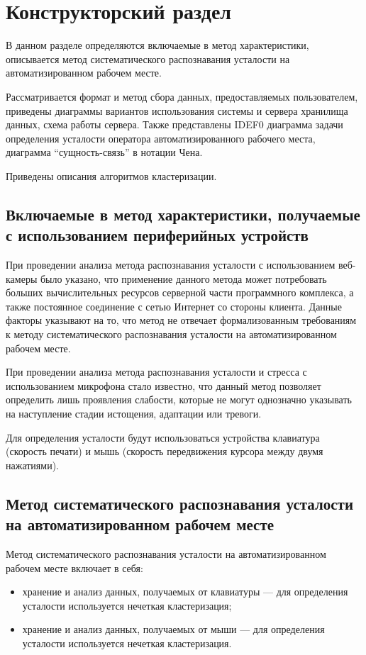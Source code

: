 \section{Конструкторский раздел}
В данном разделе определяются включаемые в метод характеристики, \newline описывается метод систематического распознавания усталости на автоматизированном рабочем месте.

Рассматривается формат и метод сбора данных, предоставляемых пользователем, приведены диаграммы вариантов использования системы и сервера хранилища данных, схема работы сервера. Также представлены IDEF0 диаграмма задачи определения усталости оператора автоматизированного рабочего места, диаграмма ``сущность-связь'' в нотации Чена.

Приведены описания алгоритмов кластеризации.

\subsection{Включаемые в метод характеристики, получаемые с использованием периферийных устройств}

При проведении анализа метода распознавания усталости с использованием веб-камеры было указано, что применение данного метода может потребовать больших вычислительных ресурсов серверной части программного комплекса, а также постоянное соединение с сетью Интернет со стороны клиента. Данные факторы указывают на то, что метод не отвечает формализованным требованиям к методу систематического распознавания усталости на автоматизированном рабочем месте.

При проведении анализа метода распознавания усталости и стресса с использованием микрофона стало известно, что данный метод позволяет определить лишь проявления слабости, которые не могут однозначно указывать на наступление стадии истощения, адаптации или тревоги.

Для определения усталости будут использоваться устройства клавиатура (скорость печати) и мышь (скорость передвижения курсора между двумя нажатиями).

\subsection{Метод систематического распознавания усталости на автоматизированном рабочем месте}
Метод систематического распознавания усталости на автоматизированном рабочем месте включает в себя:
\begin{itemize}[leftmargin=1.6\parindent]
\item хранение и анализ данных, получаемых от клавиатуры --- для определения усталости используется нечеткая кластеризация;
\item хранение и анализ данных, получаемых от мыши --- для определения усталости используется нечеткая кластеризация.
\end{itemize}

